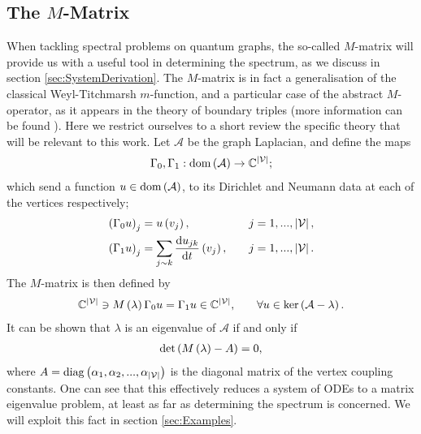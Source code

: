 \subsection{The $M$-Matrix} \label{ssec:MMatrix}
When tackling spectral problems on quantum graphs, the so-called $M$-matrix will provide us with a useful tool in determining the spectrum, as we discuss in section \ref{sec:SystemDerivation}.
The $M$-matrix is in fact a generalisation of the classical Weyl-Titchmarsh $m$-function, and a particular case of the abstract $M$-operator, as it appears in the theory of boundary triples (more information can be found ).
Here we restrict ourselves to a short review the specific theory that will be relevant to this work.
Let $\mathcal{A}$ be the graph Laplacian, and define the maps
\begin{align*}
	\Gamma_0, \Gamma_1: \mathrm{dom}\left( \mathcal{A} \right) \rightarrow \mathbb{C}^{\left\lvert \mathcal{V} \right\rvert};
\end{align*}
which send a function $u\in\mathrm{dom}\left( \mathcal{A} \right)$, to its Dirichlet and Neumann data at each of the vertices respectively;
\begin{align*}
	\left( \Gamma_0 u \right)_j &= u\left( v_j \right), \quad &j=1,...,\left\lvert \mathcal{V} \right\rvert, \\
	\left( \Gamma_1 u \right)_j &= \sum_{j\sim k}\dfrac{\mathrm{d}u_{jk}}{\mathrm{d}t}\left( v_j \right), \quad &j=1,...,\left\lvert \mathcal{V} \right\rvert. 
\end{align*}
The $M$-matrix is then defined by
\begin{align*}
	\mathbb{C}^{\left\lvert \mathcal{V} \right\rvert} \ni M\left( \lambda \right)\Gamma_0 u &= \Gamma_1 u \in \mathbb{C}^{\left\lvert \mathcal{V} \right\rvert},
	 &\quad \forall u\in\mathrm{ker}\left( \mathcal{A}-\lambda \right).
\end{align*}
It can be shown that $\lambda$ is an eigenvalue of $\mathcal{A}$ if and only if
\begin{align*}
	\mathrm{det}\left( M\left( \lambda \right) - A \right)= 0,
\end{align*}
where $A = \mathrm{diag}\left( \alpha_1, \alpha_2, ... , \alpha_{\left\lvert \mathcal{V} \right\rvert} \right)$ is the diagonal matrix of the vertex coupling constants.
One can see that this effectively reduces a system of ODEs to a matrix eigenvalue problem, at least as far as determining the spectrum is concerned.
We will exploit this fact in section \ref{sec:Examples}.

